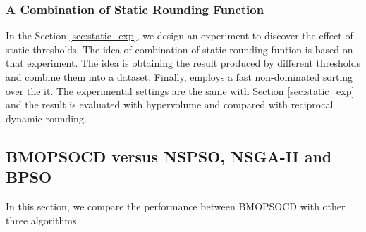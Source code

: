 \subsubsection{A Combination of Static Rounding Function}
In the Section \ref{sec:static_exp}, we design an experiment to discover the effect of static thresholds. The idea of combination of static rounding funtion
is based on that experiment. The idea is obtaining the result produced by different thresholds and combine them into a dataset. Finally, 
employs a fast non-dominated sorting over the it. The experimental settings are the same with Section \ref{sec:static_exp} and the result is 
evaluated with hypervolume and compared with reciprocal dynamic rounding.

\subsection{BMOPSOCD versus NSPSO, NSGA-II and BPSO}

In this section, we compare the performance between BMOPSOCD with other three algorithms.

